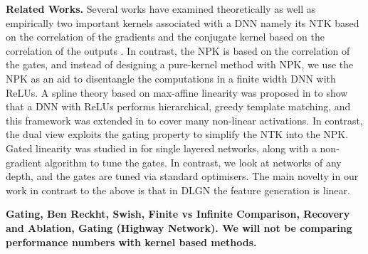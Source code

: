 \textbf{Related Works.} Several works have examined theoretically as well as empirically two important kernels associated with a DNN namely its NTK based on the correlation of the gradients and the conjugate kernel based on the correlation of the outputs \citep{spectra,laplace,belkin,genntk,disentangling,label,ntk,arora2019exact,convgp,fcgp,lee2020finite,nth}. In contrast, the NPK is based on the correlation of the gates, and instead of designing a pure-kernel method with NPK, we use the NPK as an aid to disentangle the computations in a finite width DNN with ReLUs.  %
A spline theory based on max-affine linearity was proposed in \citep{balestriero2018spline} to show that a DNN with ReLUs performs hierarchical, greedy template matching, and this framework was extended in \citep{balestriero2018hard} to cover many non-linear activations. In contrast, the dual view exploits the gating property to simplify the NTK into the NPK. Gated linearity was studied in \citep{sss} for single layered networks, along with a non-gradient algorithm to tune the gates. In contrast, we look at networks of any depth, and the gates are tuned via standard optimisers. The main novelty in our work in contrast to the above is that in DLGN the feature generation is linear.

\textbf{Gating, Ben Reckht, Swish, Finite vs Infinite Comparison, Recovery and Ablation, Gating (Highway Network). We will not be comparing performance numbers with kernel based methods.}

